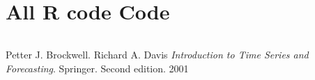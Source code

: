 \documentclass[11pt, oneside]{article}   	%
\begin{document}
\section{All R code Code}

\begin{lstlisting}
\end{lstlisting}



\begin{thebibliography}{9}
Petter J. Brockwell. Richard A. Davis
\textit{Introduction to Time Series and Forecasting}. 
Springer. Second edition. 2001
 
\end{thebibliography}
\end{document}
